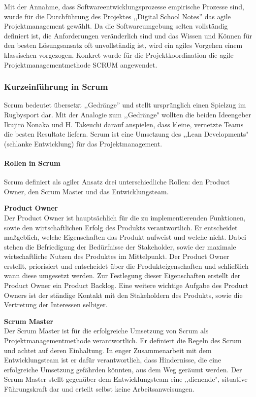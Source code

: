 Mit der Annahme, dass Softwareentwicklungsprozesse empirische Prozesse sind, wurde für die Durchführung des Projektes ,,Digital School Notes'' das agile Projektmanagement gewählt. Da die Softwareumgebung selten vollständig definiert ist, die Anforderungen veränderlich sind und das Wissen und Können für den besten Lösungsansatz oft unvollständig ist, wird ein agiles Vorgehen einem klassischen vorgezogen. Konkret wurde für die Projektkoordination die agile Projektmanagementmethode SCRUM angewendet. \cite{SCRUM}


\subsubsection{Kurzeinführung in Scrum}
Scrum bedeutet übersetzt ,,Gedränge'' und stellt ursprünglich einen Spielzug im Rugbysport dar. Mit der Analogie zum ,,Gedränge" wollten die beiden Ideengeber  Ikujirō Nonaka und H. Takeuchi darauf anspielen, dass kleine, vernetzte Teams die besten Resultate liefern. Scrum ist eine Umsetzung des ,,Lean Developments" (schlanke Entwicklung) für das Projektmanagement. \cite{SCRUM}
\paragraph{Rollen in Scrum}
Scrum definiert als agiler Ansatz drei unterschiedliche Rollen: den Product Owner, den Scrum Master und das Entwicklungsteam.

\textbf{Product Owner}\\
Der Product Owner ist hauptsächlich für die zu implementierenden Funktionen, sowie den wirtschaftlichen Erfolg des Produkts verantwortlich. Er entscheidet maßgeblich, welche Eigenschaften das Produkt aufweist und welche nicht. Dabei stehen die Befriedigung der Bedürfnisse der Stakeholder, sowie der maximale wirtschaftliche Nutzen des Produktes im Mittelpunkt. Der Product Owner erstellt, priorisiert und entscheidet über die Produkteigenschaften und schließlich wann diese umgesetzt werden. Zur Festlegung dieser Eigenschaften erstellt der Product Owner ein Product Backlog. Eine weitere wichtige Aufgabe des Product Owners ist der ständige Kontakt mit den Stakeholdern des Produkts, sowie die Vertretung der Interessen selbiger. \cite{SCRUM}

\textbf{Scrum Master}\\
Der Scrum Master ist für die erfolgreiche Umsetzung von Scrum als Projektmanagementmethode verantwortlich. Er definiert die Regeln des Scrum und achtet auf deren Einhaltung. In enger Zusammenarbeit mit dem Entwicklungsteam ist er dafür verantwortlich, dass Hindernisse, die eine erfolgreiche Umsetzung gefährden könnten, aus dem Weg geräumt werden. Der Scrum Master stellt gegenüber dem Entwicklungsteam eine ,,dienende", situative Führungskraft dar und erteilt selbst keine Arbeitsanweisungen. \cite{SCRUM}

